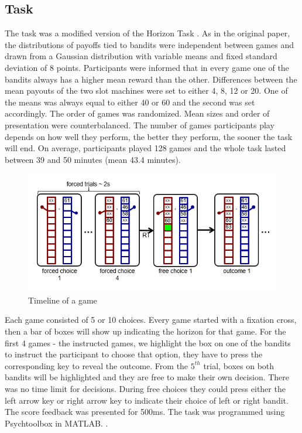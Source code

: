 \documentclass[12pt]{article}
\begin{document}
	\subsection*{Task}
	The task was a modified version of the Horizon Task \cite{}. As in the original paper, the distributions of payoffs tied to bandits were independent between games and drawn from a Gaussian distribution with variable means and fixed standard deviation of 8 points. Participants were informed that in every game one of the bandits always has a higher mean reward than the other. Differences between the mean payouts of the two slot machines were set to either 4, 8, 12 or 20. One of the means was always equal to either 40 or 60 and the second was set accordingly. The order of games was randomized. Mean sizes and order of presentation were counterbalanced. The number of games participants play depends on how well they perform, the better they perform, the sooner the task will end. On average, participants played 128 games and the whole task lasted between 39 and 50 minutes (mean 43.4 minutes). 
	
	\begin{figure}[H]
		\begin{center}
			\includegraphics[width=\textwidth]{figures/taskfig1.PNG}
			\caption{Timeline of a game}
			\label{fig:modelbased}
		\end{center}
	\end{figure}
	
	Each game consisted of 5 or 10 choices. Every game started with a fixation cross, then a bar of boxes will show up indicating the horizon for that game. For the first 4 games - the instructed games, we highlight the box on one of the bandits to instruct the participant to choose that option, they have to press the corresponding key to reveal the outcome. From the $5^{th}$ trial, boxes on both bandits will be highlighted and they are free to make their own decision. There was no time limit for decisions. During free choices they could press either the left arrow key or right arrow key to indicate their choice of left or right bandit. The score feedback was presented for 500ms. The task was programmed using Psychtoolbox in MATLAB. \cite{}.
	
\end{document}
